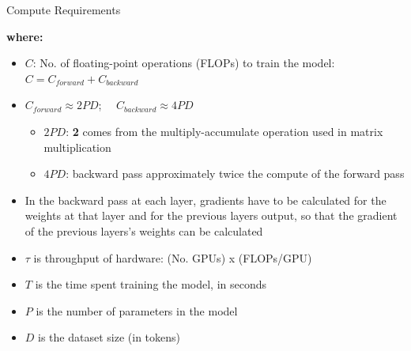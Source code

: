 \begin{vbframe}{Compute Requirements}

\textbf{where:}

\begin{itemize}
    \item $C$: No. of floating-point operations (FLOPs) to train the model:\\
          $C = C_{forward} + C_{backward}$
	\item $C_{forward} \approx 2 P D$; $\quad C_{backward} \approx 4 P D$
	\begin{itemize}
	    \item $2PD$: \textbf{2} comes from the multiply-accumulate operation used in matrix multiplication
        \item $4PD$: backward pass approximately twice the compute of the forward pass
	\end{itemize}
    \item In the backward pass at each layer, gradients have to be calculated for the weights at that layer and for the previous layers output, so that the gradient of the previous layers's weights can be calculated
	\item $\tau$ is throughput of hardware: (No. GPUs) x (FLOPs/GPU)
	\item $T$ is the time spent training the model, in seconds
	\item $P$ is the number of parameters in the model
	\item $D$ is the dataset size (in tokens)
\end{itemize}

\end{vbframe}


